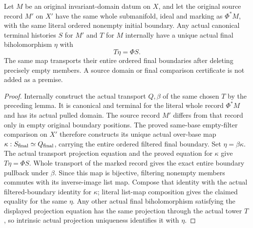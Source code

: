 \begin{theorem}
\label{hir:original-empty-boundary-terminal-base-comparison}
\leanok
Let $M$ be an original invariant-domain datum on $X$, and let the original
source record $M'$ on $X'$ have the same whole submanifold, ideal and
marking as $\Phi^*M$, with the same literal ordered nonempty initial
boundary. Any actual canonical terminal histories $S$ for $M'$ and $T$
for $M$ internally have a unique actual final biholomorphism $\eta$ with
\[
 T\eta=\Phi S.
\]
The same map transports their entire ordered final boundaries after
deleting precisely empty members. A source domain or final comparison
certificate is not added as a premise.
\end{theorem}
\begin{proof}
Internally construct the actual transport $Q,\beta$ of the same chosen
$T$ by the preceding lemma. It is canonical and terminal for the literal
whole record $\Phi^*M$ and has its actual pulled domain. The source
record $M'$ differs from that record only in empty original boundary
positions. The proved same-base empty-filter comparison on $X'$ therefore
constructs its unique actual over-base map $\kappa:S_{\rm final}\simeq
Q_{\rm final}$, carrying the entire ordered filtered final boundary.
Set $\eta=\beta\kappa$. The actual transport projection equation and
the proved equation for $\kappa$ give $T\eta=\Phi S$. Whole transport
of the marked record gives the exact entire boundary pullback under
$\beta$. Since this map is bijective, filtering nonempty members commutes
with its inverse-image list map. Compose that identity with the actual
filtered-boundary identity for $\kappa$; literal list-map composition
gives the claimed equality for the same $\eta$. Any other actual final
biholomorphism satisfying the displayed projection equation has the same
projection through the actual tower $T$, so intrinsic actual projection
uniqueness identifies it with $\eta$.
\end{proof}


